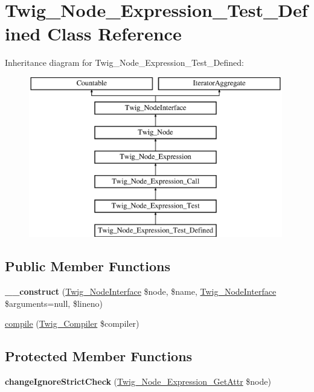 \hypertarget{classTwig__Node__Expression__Test__Defined}{}\section{Twig\+\_\+\+Node\+\_\+\+Expression\+\_\+\+Test\+\_\+\+Defined Class Reference}
\label{classTwig__Node__Expression__Test__Defined}
Inheritance diagram for Twig\+\_\+\+Node\+\_\+\+Expression\+\_\+\+Test\+\_\+\+Defined\+:\begin{figure}[H]
\begin{center}
\leavevmode
\includegraphics[height=7.000000cm]{classTwig__Node__Expression__Test__Defined}
\end{center}
\end{figure}
\subsection*{Public Member Functions}
\begin{DoxyCompactItemize}
\item 
{\bfseries \+\_\+\+\_\+construct} (\hyperlink{interfaceTwig__NodeInterface}{Twig\+\_\+\+Node\+Interface} \$node, \$name, \hyperlink{interfaceTwig__NodeInterface}{Twig\+\_\+\+Node\+Interface} \$arguments=null, \$lineno)\hypertarget{classTwig__Node__Expression__Test__Defined_a3cd0338cd845946af6e70a48d1a5d176}{}\label{classTwig__Node__Expression__Test__Defined_a3cd0338cd845946af6e70a48d1a5d176}

\item 
\hyperlink{classTwig__Node__Expression__Test__Defined_a2b142989531d8eaaa809ef32c2d8e29d}{compile} (\hyperlink{classTwig__Compiler}{Twig\+\_\+\+Compiler} \$compiler)
\end{DoxyCompactItemize}
\subsection*{Protected Member Functions}
\begin{DoxyCompactItemize}
\item 
{\bfseries change\+Ignore\+Strict\+Check} (\hyperlink{classTwig__Node__Expression__GetAttr}{Twig\+\_\+\+Node\+\_\+\+Expression\+\_\+\+Get\+Attr} \$node)\hypertarget{classTwig__Node__Expression__Test__Defined_aa5e8bb3693543b416d75211c5cff7cc6}{}\label{classTwig__Node__Expression__Test__Defined_aa5e8bb3693543b416d75211c5cff7cc6}

\end{DoxyCompactItemize}
